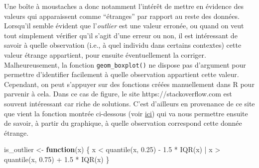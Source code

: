 \documentclass[
  letterpaper,
]{book}
\newenvironment{Shaded}{\begin{snugshade}}{\end{snugshade}}
\newcommand{\ControlFlowTok}[1]{\textcolor[rgb]{0.00,0.23,0.31}{\textbf{#1}}}
\newcommand{\FloatTok}[1]{\textcolor[rgb]{0.68,0.00,0.00}{#1}}
\newcommand{\FunctionTok}[1]{\textcolor[rgb]{0.28,0.35,0.67}{#1}}
\newcommand{\NormalTok}[1]{\textcolor[rgb]{0.00,0.23,0.31}{#1}}
\newcommand{\OtherTok}[1]{\textcolor[rgb]{0.00,0.23,0.31}{#1}}
\newcommand{\SpecialCharTok}[1]{\textcolor[rgb]{0.37,0.37,0.37}{#1}}
\begin{document}
Une boîte à moustaches a donc notamment l'intérêt de mettre en évidence
des valeurs qui apparaissent comme ``étranges'' par rapport au reste des
données. Lorsqu'il semble évident que l'\emph{outlier} est une valeur
erronée, ou quand on veut tout simplement vérifier qu'il s'agit d'une
erreur ou non, il est intéressant de savoir à quelle observation (i.e.,
à quel individu dans certains contextes) cette valeur étrange
appartient, pour ensuite éventuellement la corriger. Malheureusement, la
fonction \texttt{geom\_boxplot()} ne dispose pas d'argument pour
permettre d'identifier facilement à quelle observation appartient cette
valeur. Cependant, on peut s'appuyer sur des fonctions créées
manuellement dans R pour parvenir à cela. Dans ce cas de figure, le site
https://stackoverflow.com est souvent intéressant car riche de
solutions. C'est d'ailleurs en provenance de ce site que vient la
fonction montrée ci-dessous (voir
\href{https://stackoverflow.com/questions/33524669/labeling-outliers-of-boxplots-in-r}{ici})
qui va nous permettre ensuite de savoir, à partir du graphique, à quelle
observation correspond cette donnée étrange.

\begin{Shaded}
\begin{Highlighting}[]
\NormalTok{is\_outlier }\OtherTok{\textless{}{-}} \ControlFlowTok{function}\NormalTok{(x) \{}
\NormalTok{  x }\SpecialCharTok{\textless{}} \FunctionTok{quantile}\NormalTok{(x, }\FloatTok{0.25}\NormalTok{) }\SpecialCharTok{{-}} \FloatTok{1.5} \SpecialCharTok{*} \FunctionTok{IQR}\NormalTok{(x) }\SpecialCharTok{|}
\NormalTok{    x }\SpecialCharTok{\textgreater{}} \FunctionTok{quantile}\NormalTok{(x, }\FloatTok{0.75}\NormalTok{) }\SpecialCharTok{+} \FloatTok{1.5} \SpecialCharTok{*} \FunctionTok{IQR}\NormalTok{(x)}
\NormalTok{\}}
\end{Highlighting}
\end{Shaded}
\end{document}
